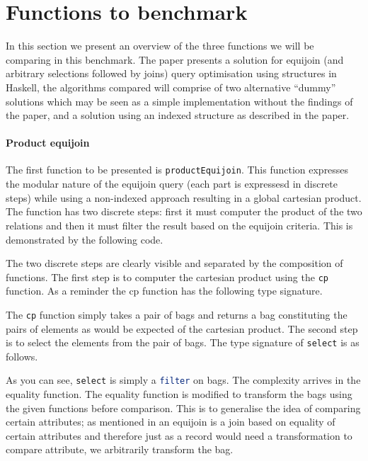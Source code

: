 \section{Functions to benchmark}
In this section we present an overview of the three functions we will
be comparing in this benchmark. The paper \relalg{} presents a solution for
equijoin (and arbitrary selections followed by joins) query optimisation using
structures in Haskell, the algorithms compared will comprise of two alternative
``dummy'' solutions which may be seen as a simple implementation without the
findings of the paper, and a solution using an indexed structure as described
in the paper.

\paragraph{Product equijoin} The first function to be presented is
\lstinline[language=Haskell]{productEquijoin}. This function
expresses the modular nature of the equijoin query (each part is expressesd in
discrete steps) while using a non-indexed approach resulting in a global
cartesian product.
The function has two discrete steps: first it must computer the product of the
two relations and then it must filter the result based on the equijoin criteria.
This is demonstrated by the following code.



\noindent
The two discrete steps are clearly visible and separated by the composition of
functions. The first step is to computer the cartesian product using the
\lstinline[language=Haskell]{cp} function. As a reminder the {cp} function has
the following type signature.


\noindent
The \lstinline[language=Haskell]{cp} function simply takes a pair of bags and
returns a bag constituting the pairs of elements as would be expected of the
cartesian product. The second step is to select the elements from the pair of
bags. The type signature of \lstinline[language=Haskell]{select} is as follows.


\noindent
As you can see, \lstinline[language=Haskell]{select} is simply a
\lstinline[language=Haskell]{filter} on bags. The complexity arrives in the
equality function. The equality function is modified to transform the bags using
the given functions before comparison. This is to generalise the idea of
comparing certain attributes; as mentioned in  an
equijoin is a join based on equality of certain attributes and therefore just as
a record would need a transformation to compare attribute, we arbitrarily
transform the bag.

